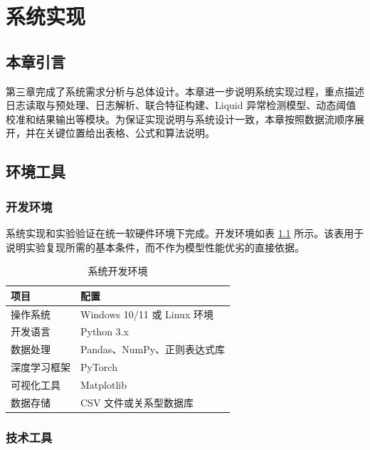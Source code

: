 \chapter{系统实现}
\vspace{7pt}

\section{本章引言}

第三章完成了系统需求分析与总体设计。本章进一步说明系统实现过程，重点描述日志读取与预处理、日志解析、联合特征构建、Liquid 异常检测模型、动态阈值校准和结果输出等模块。为保证实现说明与系统设计一致，本章按照数据流顺序展开，并在关键位置给出表格、公式和算法说明。

\section{环境工具}

\subsection{开发环境}

系统实现和实验验证在统一软硬件环境下完成。开发环境如表 \ref{tab:development_environment_revised} 所示。该表用于说明实验复现所需的基本条件，而不作为模型性能优劣的直接依据。

\begin{table}[htbp]
    \centering
    \caption{系统开发环境}
    \label{tab:development_environment_revised}
    \begin{tabular}{p{4cm}p{8cm}}
        \hline
        \textbf{项目} & \textbf{配置} \\
        \hline
        操作系统 & Windows 10/11 或 Linux 环境 \\
        开发语言 & Python 3.x \\
        数据处理 & Pandas、NumPy、正则表达式库 \\
        深度学习框架 & PyTorch \\
        可视化工具 & Matplotlib \\
        数据存储 & CSV 文件或关系型数据库 \\
        \hline
    \end{tabular}
\end{table}

\subsection{技术工具}

